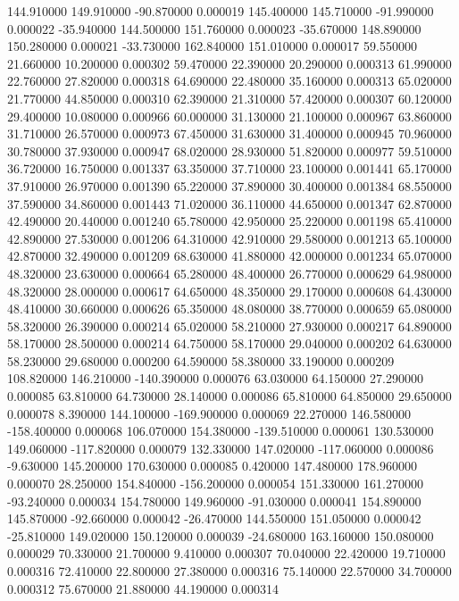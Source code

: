 144.910000 149.910000 -90.870000 0.000019 
145.400000 145.710000 -91.990000 0.000022 
-35.940000 144.500000 151.760000 0.000023 
-35.670000 148.890000 150.280000 0.000021 
-33.730000 162.840000 151.010000 0.000017 
59.550000 21.660000 10.200000 0.000302 
59.470000 22.390000 20.290000 0.000313 
61.990000 22.760000 27.820000 0.000318 
64.690000 22.480000 35.160000 0.000313 
65.020000 21.770000 44.850000 0.000310 
62.390000 21.310000 57.420000 0.000307 
60.120000 29.400000 10.080000 0.000966 
60.000000 31.130000 21.100000 0.000967 
63.860000 31.710000 26.570000 0.000973 
67.450000 31.630000 31.400000 0.000945 
70.960000 30.780000 37.930000 0.000947 
68.020000 28.930000 51.820000 0.000977 
59.510000 36.720000 16.750000 0.001337 
63.350000 37.710000 23.100000 0.001441 
65.170000 37.910000 26.970000 0.001390 
65.220000 37.890000 30.400000 0.001384 
68.550000 37.590000 34.860000 0.001443 
71.020000 36.110000 44.650000 0.001347 
62.870000 42.490000 20.440000 0.001240 
65.780000 42.950000 25.220000 0.001198 
65.410000 42.890000 27.530000 0.001206 
64.310000 42.910000 29.580000 0.001213 
65.100000 42.870000 32.490000 0.001209 
68.630000 41.880000 42.000000 0.001234 
65.070000 48.320000 23.630000 0.000664 
65.280000 48.400000 26.770000 0.000629 
64.980000 48.320000 28.000000 0.000617 
64.650000 48.350000 29.170000 0.000608 
64.430000 48.410000 30.660000 0.000626 
65.350000 48.080000 38.770000 0.000659 
65.080000 58.320000 26.390000 0.000214 
65.020000 58.210000 27.930000 0.000217 
64.890000 58.170000 28.500000 0.000214 
64.750000 58.170000 29.040000 0.000202 
64.630000 58.230000 29.680000 0.000200 
64.590000 58.380000 33.190000 0.000209 
108.820000 146.210000 -140.390000 0.000076 
63.030000 64.150000 27.290000 0.000085 
63.810000 64.730000 28.140000 0.000086 
65.810000 64.850000 29.650000 0.000078 
8.390000 144.100000 -169.900000 0.000069 
22.270000 146.580000 -158.400000 0.000068 
106.070000 154.380000 -139.510000 0.000061 
130.530000 149.060000 -117.820000 0.000079 
132.330000 147.020000 -117.060000 0.000086 
-9.630000 145.200000 170.630000 0.000085 
0.420000 147.480000 178.960000 0.000070 
28.250000 154.840000 -156.200000 0.000054 
151.330000 161.270000 -93.240000 0.000034 
154.780000 149.960000 -91.030000 0.000041 
154.890000 145.870000 -92.660000 0.000042 
-26.470000 144.550000 151.050000 0.000042 
-25.810000 149.020000 150.120000 0.000039 
-24.680000 163.160000 150.080000 0.000029 
70.330000 21.700000 9.410000 0.000307 
70.040000 22.420000 19.710000 0.000316 
72.410000 22.800000 27.380000 0.000316 
75.140000 22.570000 34.700000 0.000312 
75.670000 21.880000 44.190000 0.000314 
